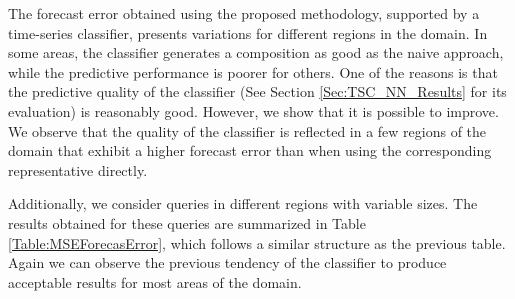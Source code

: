 The forecast error obtained using the proposed methodology, supported by a time-series classifier, presents variations for different regions in the domain. In some areas, the classifier generates a composition as good as the naive approach, while the predictive performance is poorer for others. One of the reasons is that the predictive quality of the classifier (See Section \ref{Sec:TSC_NN_Results} for its evaluation) is reasonably good. However, we show that it is possible to improve. We observe that the quality of the classifier is reflected in a few regions of the domain that exhibit a higher forecast error than when using the corresponding representative directly.

Additionally, we consider queries in different regions with variable sizes. The results obtained for these queries are summarized in Table \ref{Table:MSEForecasError}, which follows a similar structure as the previous table. Again we can observe the previous tendency of the classifier to produce acceptable results for most areas of the domain.

